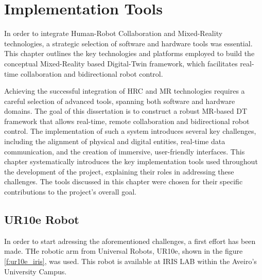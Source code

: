 

\chapter{Implementation Tools}%
\label{chapter:tools}



\begin{introduction}
    In order to integrate Human-Robot Collaboration and Mixed-Reality technologies, a strategic selection of software and hardware tools was essential. This chapter outlines the key technologies and platforms employed to build the conceptual Mixed-Reality based Digital-Twin framework, which facilitates real-time collaboration and bidirectional robot control.
\end{introduction}

Achieving the successful integration of \ac{HRC} and \ac{MR} technologies requires a careful selection of advanced tools, spanning both software and hardware domains. The goal of this dissertation is to construct a robust \ac{MR}-based \ac{DT} framework that allows real-time, remote collaboration and bidirectional robot control. The implementation of such a system introduces several key challenges, including the alignment of physical and digital entities, real-time data communication, and the creation of immersive, user-friendly interfaces. This chapter systematically introduces the key implementation tools used throughout the development of the project, explaining their roles in addressing these challenges. 
The tools discussed in this chapter were chosen for their specific contributions to the project’s overall goal. 

\section{UR10e Robot}

In order to start adressing the aforementioned challenges, a first effort has been made. THe robotic arm from Universal Robots, UR10e, shown in the figure \ref{f:ur10e_iris}, was used. This robot is available at IRIS LAB within the Aveiro's University Campus.

